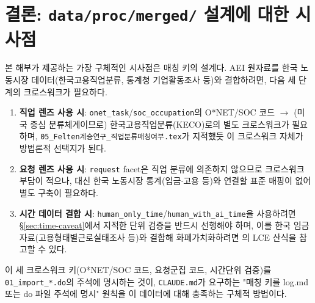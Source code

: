 \documentclass[11pt]{article}
\begin{document}
\section{결론: \texttt{data/proc/merged/} 설계에 대한 시사점}
\label{sec:conclusion}

본 해부가 제공하는 가장 구체적인 시사점은 매칭 키의 설계다. AEI 원자료를 한국 노동시장 데이터(한국고용직업분류, 통계청 기업활동조사 등)와 결합하려면, 다음 세 단계의 크로스워크가 필요하다.

\begin{enumerate}[label=(\arabic*)]
  \item \textbf{직업 렌즈 사용 시}: \texttt{onet\_task}/\texttt{soc\_occupation}의 O*NET/SOC 코드 $\to$ (미국 중심 분류체계이므로) 한국고용직업분류(KECO)로의 별도 크로스워크가 필요하며, \texttt{05\_Felten계승연구\_직업분류매칭여부.tex}가 지적했듯 이 크로스워크 자체가 방법론적 선택지가 된다.
  \item \textbf{요청 렌즈 사용 시}: \texttt{request} facet은 직업 분류에 의존하지 않으므로 크로스워크 부담이 적으나, 대신 한국 노동시장 통계(임금$\cdot$고용 등)와 연결할 표준 매핑이 없어 별도 구축이 필요하다.
  \item \textbf{시간 데이터 결합 시}: \texttt{human\_only\_time}/\texttt{human\_with\_ai\_time}을 사용하려면 \S\ref{sec:time-caveat}에서 지적한 단위 검증을 반드시 선행해야 하며, 이를 한국 임금 자료(고용형태별근로실태조사 등)와 결합해 화폐가치화하려면 \citet{fan-2026-aggregate-gains-from-ai}의 LCE 산식을 참고할 수 있다.
\end{enumerate}

이 세 크로스워크 키(O*NET/SOC 코드, 요청군집 코드, 시간단위 검증)를 \texttt{01\_import\_*.do}의 주석에 명시하는 것이, \texttt{CLAUDE.md}가 요구하는 "매칭 키를 log.md 또는 do 파일 주석에 명시" 원칙을 이 데이터에 대해 충족하는 구체적 방법이다.

\printbibliography[title={참고문헌}]
\end{document}
